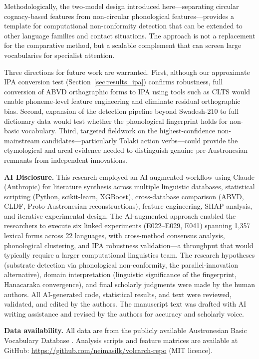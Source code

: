 \documentclass[12pt]{article}
\begin{document}
Methodologically, the two-model design introduced here---separating circular cognacy-based features from non-circular phonological features---provides a template for computational non-conformity detection that can be extended to other language families and contact situations.
The approach is not a replacement for the comparative method, but a scalable complement that can screen large vocabularies for specialist attention.

Three directions for future work are warranted.
First, although our approximate IPA conversion test (Section~\ref{sec:results_ipa}) confirms robustness, full conversion of ABVD orthographic forms to IPA using tools such as CLTS \citep{anderson2018} would enable phoneme-level feature engineering and eliminate residual orthographic bias.
Second, expansion of the detection pipeline beyond Swadesh-210 to full dictionary data would test whether the phonological fingerprint holds for non-basic vocabulary.
Third, targeted fieldwork on the highest-confidence non-mainstream candidates---particularly Tolaki action verbs---could provide the etymological and areal evidence needed to distinguish genuine pre-Austronesian remnants from independent innovations.

\vspace{1em}
\noindent\textbf{AI Disclosure.}
This research employed an AI-augmented workflow using Claude (Anthropic) for literature synthesis across multiple linguistic databases, statistical scripting (Python, scikit-learn, XGBoost), cross-database comparison (ABVD, CLDF, Proto-Austronesian reconstructions), feature engineering, SHAP analysis, and iterative experimental design.
The AI-augmented approach enabled the researchers to execute six linked experiments (E022--E029, E041) spanning 1,357 lexical forms across 22 languages, with cross-method consensus analysis, phonological clustering, and IPA robustness validation---a throughput that would typically require a larger computational linguistics team.
The research hypotheses (substrate detection via phonological non-conformity, the parallel-innovation alternative), domain interpretation (linguistic significance of the fingerprint, Hanacaraka convergence), and final scholarly judgments were made by the human authors.
All AI-generated code, statistical results, and text were reviewed, validated, and edited by the authors.
The manuscript text was drafted with AI writing assistance and revised by the authors for accuracy and scholarly voice.

\vspace{1em}
\noindent\textbf{Data availability.} All data are from the publicly available Austronesian Basic Vocabulary Database \citep{greenhill2008}. Analysis scripts and feature matrices are available at GitHub: \url{https://github.com/neimasilk/volcarch-repo} (MIT licence).


\end{document}

